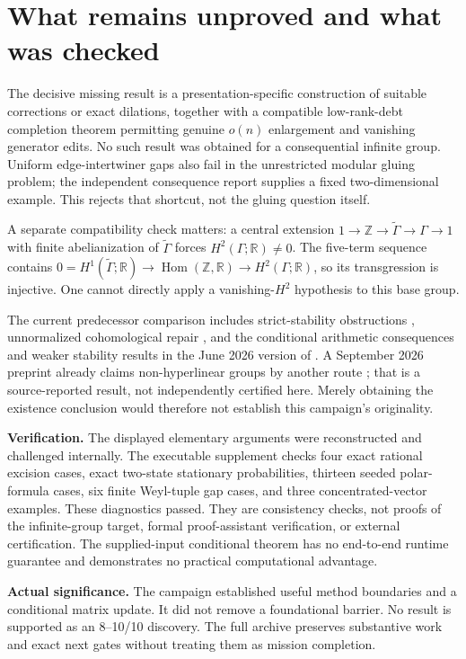 \documentclass[11pt]{article}
\begin{document}
\section{What remains unproved and what was checked}
The decisive missing result is a presentation-specific construction of suitable corrections or exact dilations, together with a compatible low-rank-debt completion theorem permitting genuine $o(n)$ enlargement and vanishing generator edits. No such result was obtained for a consequential infinite group. Uniform edge-intertwiner gaps also fail in the unrestricted modular gluing problem; the independent consequence report supplies a fixed two-dimensional example. This rejects that shortcut, not the gluing question itself.

A separate compatibility check matters: a central extension $1\to\mathbb Z\to\widetilde\Gamma\to\Gamma\to1$ with finite abelianization of $\widetilde\Gamma$ forces $H^2(\Gamma;\mathbb R)\ne0$. The five-term sequence contains $0=H^1(\widetilde\Gamma;\mathbb R)\to\operatorname{Hom}(\mathbb Z,\mathbb R)\to H^2(\Gamma;\mathbb R)$, so its transgression is injective. One cannot directly apply a vanishing-$H^2$ hypothesis to this base group.

The current predecessor comparison includes strict-stability obstructions \cite{BL}, unnormalized cohomological repair \cite{DGLT}, and the conditional arithmetic consequences and weaker stability results in the June 2026 version of \cite{DV}. A September 2026 preprint already claims non-hyperlinear groups by another route \cite{ALT}; that is a source-reported result, not independently certified here. Merely obtaining the existence conclusion would therefore not establish this campaign's originality.

\textbf{Verification.} The displayed elementary arguments were reconstructed and challenged internally. The executable supplement checks four exact rational excision cases, exact two-state stationary probabilities, thirteen seeded polar-formula cases, six finite Weyl-tuple gap cases, and three concentrated-vector examples. These diagnostics passed. They are consistency checks, not proofs of the infinite-group target, formal proof-assistant verification, or external certification. The supplied-input conditional theorem has no end-to-end runtime guarantee and demonstrates no practical computational advantage.

\textbf{Actual significance.} The campaign established useful method boundaries and a conditional matrix update. It did not remove a foundational barrier. No result is supported as an 8--10/10 discovery. The full archive preserves substantive work and exact next gates without treating them as mission completion.
\end{document}
